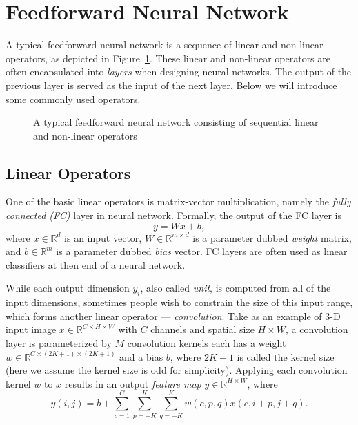 \section{Feedforward Neural Network} %
\label{sec:dl-feedforward}
A typical feedforward neural network is a sequence of linear and non-linear operators, as depicted in Figure~\ref{fig:dl-feedforward}. These linear and non-linear operators are often encapsulated into \emph{layers} when designing neural networks. The output of the previous layer is served as the input of the next layer. Below we will introduce some commonly used operators.
\begin{figure}[t]
\begin{center}
\fbox{\rule{0pt}{2in} \rule{0.9\linewidth}{0pt}}
\caption{A typical feedforward neural network consisting of sequential linear and non-linear operators}
\label{fig:dl-feedforward}
\end{center}
\end{figure}

\subsection{Linear Operators} %
\label{sub:dl-linops}
One of the basic linear operators is matrix-vector multiplication, namely the \emph{fully connected (FC)} layer in neural network. Formally, the output of the FC layer is
\begin{equation}
  y=Wx+b,
\end{equation}
where $x\in\mathbb{R}^d$ is an input vector, $W\in\mathbb{R}^{m\times d}$ is a parameter dubbed \emph{weight} matrix, and $b\in\mathbb{R}^m$ is a parameter dubbed \emph{bias} vector. FC layers are often used as linear classifiers at then end of a neural network.

While each output dimension $y_i$, also called \emph{unit}, is computed from all of the input dimensions, sometimes people wish to constrain the size of this input range, which forms another linear operator --- \emph{convolution}. Take as an example of 3-D input image $x\in\mathbb{R}^{C\times H\times W}$ with $C$ channels and spatial size $H\times W$, a convolution layer is parameterized by $M$ convolution kernels each has a weight $w\in\mathbb{R}^{C\times (2K+1)\times (2K+1)}$ and a bias $b$, where $2K+1$ is called the kernel size (here we assume the kernel size is odd for simplicity). Applying each convolution kernel $w$ to $x$ results in an output \emph{feature map} $y\in\mathbb{R}^{H\times W}$, where
\begin{equation}
  y(i,j) = b + \sum_{c=1}^C \sum_{p=-K}^K \sum_{q=-K}^K w(c,p,q) x(c,i+p,j+q).
\end{equation}

